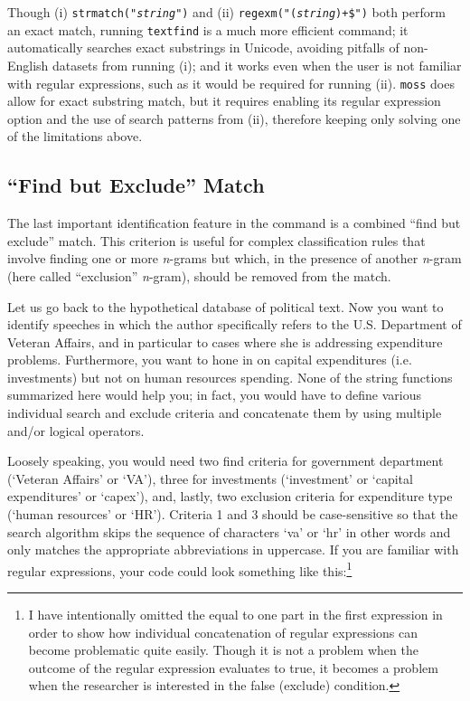 Though (i) {\tt strmatch("{\it string}")} and (ii) {\tt regexm("\stcaret({\it string})+\$")} both perform an exact match, running {\tt textfind} is a much more efficient command; it automatically searches exact substrings in Unicode, avoiding pitfalls of non-English datasets from running (i); and it works even when the user is not familiar with regular expressions, such as it would be required for running (ii). {\tt moss} does allow for exact substring match, but it requires enabling its regular expression option and the use of search patterns from (ii), therefore keeping only solving one of the limitations above.

\subsection[Multiple Criteria]{``Find but Exclude'' Match}
The last important identification feature in the command is a combined ``find but exclude'' match. This criterion is useful for complex classification rules that involve finding one or more {\it n}-grams but which, in the presence of another {\it n}-gram (here called ``exclusion'' {\it n}-gram), should be removed from the match.

Let us go back to the hypothetical database of political text. Now you want to identify speeches in which the author specifically refers to the U.S. Department of Veteran Affairs, and in particular to cases where she is addressing expenditure problems. Furthermore, you want to hone in on capital expenditures (i.e. investments) but not on human resources spending. None of the string functions summarized here would help you; in fact, you would have to define various individual search and exclude criteria and concatenate them by using multiple and/or logical operators.

Loosely speaking, you would need two find criteria for government department (`Veteran Affairs' or `VA'), three for investments (`investment' or `capital expenditures' or `capex'), and, lastly, two exclusion criteria for expenditure type (`human resources' or `HR'). Criteria 1 and 3 should be case-sensitive so that the search algorithm skips the sequence of characters `va' or `hr' in other words and only matches the appropriate abbreviations in uppercase. If you are familiar with regular expressions, your code could look something like this:\footnote{I have intentionally omitted the equal to one part in the first expression in order to show how individual concatenation of regular expressions can become problematic quite easily. Though it is not a problem when the outcome of the regular expression evaluates to true, it becomes a problem when the researcher is interested in the false (exclude) condition.}


